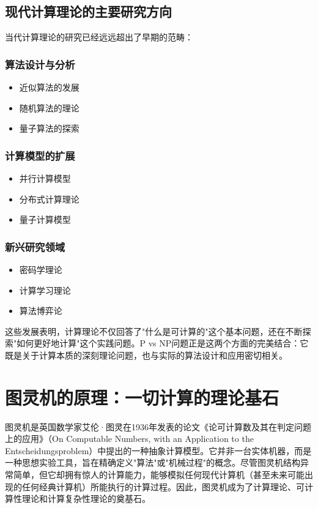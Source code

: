 \documentclass[a4paper,12pt]{ctexart}
\begin{document}
\subsection{现代计算理论的主要研究方向}
当代计算理论的研究已经远远超出了早期的范畴：

\subsubsection{算法设计与分析}
\begin{itemize}
    \item 近似算法的发展
    \item 随机算法的理论
    \item 量子算法的探索
\end{itemize}

\subsubsection{计算模型的扩展}
\begin{itemize}
    \item 并行计算模型
    \item 分布式计算理论
    \item 量子计算模型
\end{itemize}

\subsubsection{新兴研究领域}
\begin{itemize}
    \item 密码学理论
    \item 计算学习理论
    \item 算法博弈论
\end{itemize}

这些发展表明，计算理论不仅回答了"什么是可计算的"这个基本问题，还在不断探索"如何更好地计算"这个实践问题。P vs NP问题正是这两个方面的完美结合：它既是关于计算本质的深刻理论问题，也与实际的算法设计和应用密切相关。

\section{图灵机的原理：一切计算的理论基石}
图灵机是英国数学家艾伦·图灵在1936年发表的论文《论可计算数及其在判定问题上的应用》（On Computable Numbers, with an Application to the Entscheidungsproblem）中提出的一种抽象计算模型。它并非一台实体机器，而是一种思想实验工具，旨在精确定义"算法"或"机械过程"的概念。尽管图灵机结构异常简单，但它却拥有惊人的计算能力，能够模拟任何现代计算机（甚至未来可能出现的任何经典计算机）所能执行的计算过程。因此，图灵机成为了计算理论、可计算性理论和计算复杂性理论的奠基石。
\end{document}
